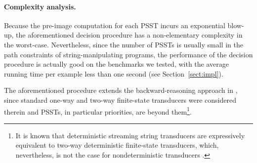 \paragraph*{Complexity analysis.} Because the pre-image computation for each PSST incurs an exponential blow-up, the aforementioned decision procedure has a non-elementary complexity in the worst-case. Nevertheless, since the number of PSSTs is usually small in the path constraints of string-manipulating programs, the performance of the decision procedure is actually good on the benchmarks we tested, with the average running time per example less than one second (see Section~\ref{sect:impl}).


\begin{remark}
The aforementioned procedure extends the backward-reasoning approach in \cite{CCH+18,CHL+19}, since standard one-way and two-way finite-state transducers were considered therein and PSSTs, in particular priorities, are beyond them\footnote{It is known that deterministic streaming string transducers are expressively equivalent to two-way deterministic finite-state transducers, which, nevertheless, is not the case for nondeterministic transducers \cite{AC10,AD11}.}. 
\end{remark}




